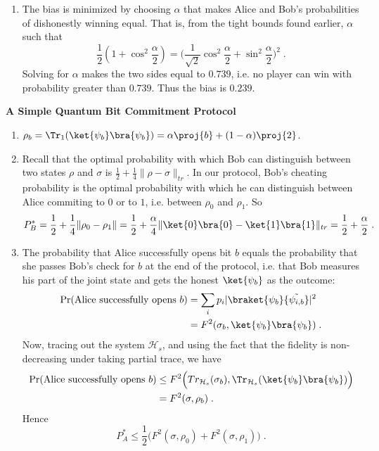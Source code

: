 \begin{exercises}
\begin{enumerate}
\item The bias is minimized by choosing $\alpha$ that makes Alice and Bob's probabilities of dishonestly winning equal. That is, from the tight bounds found earlier, $\alpha$ such that
\begin{equation*}
\frac12(1+\cos^2\frac{\alpha}{2}) = \Big(\frac{1}{\sqrt{2}}\cos^2\frac{\alpha}{2} + \sin^2\frac{\alpha}{2}\Big)^2\;.
\end{equation*}
Solving for $\alpha$ makes the two sides equal to $0.739$, i.e. no player can win with probability greater than $0.739$. Thus the bias is $0.239$.
\end{enumerate}

\item {\bf A Simple Quantum Bit Commitment Protocol}
\begin{enumerate}
\item $\rho_b = \Tr_1(\ket{\psi_b}\bra{\psi_b}) = \alpha \proj{b} + (1-\alpha) \proj{2}$.

\item Recall that the optimal probability with which Bob can distinguish between two states $\rho$ and $\sigma$ is $\frac12 + \frac14 \|\rho-\sigma\|_{tr}$.
In our protocol, Bob's cheating probability is the optimal probability with which he can distinguish between Alice commiting to $0$ or to $1$, i.e. between $\rho_0$ and $\rho_1$. 
So 
\[ P_B^{*} = \frac12 + \frac14 \|\rho_0 - \rho_1\| = \frac12 + \frac{\alpha}{4} \| \ket{0}\bra{0}- \ket{1}\bra{1}\|_{tr} = \frac12 + \frac{\alpha}{2}\;.\]

\item The probability that Alice successfully opens bit $b$ equals the probability that she passes Bob's check for $b$ at the end of the protocol, i.e. that Bob measures his part of the joint state and gets the honest $\ket{\psi_b}$ as the outcome:
\begin{align*}
\Pr(\mbox{Alice successfully opens $b$}) &= \sum_{i} p_i |\braket{\psi_b}{\tilde{\psi_{i,b}}}|^2 \\
&= F^2(\sigma_b, \ket{\psi_b}\bra{\psi_b})\;.
\end{align*}
Now, tracing out the system $\mathcal{H}_s$, and using the fact that the fidelity is non-decreasing under taking partial trace, we have
\begin{align*}
\Pr(\mbox{Alice successfully opens $b$}) &\leq F^2\Big(Tr_{\mathcal{H}_s}(\sigma_b), \Tr_{\mathcal{H}_s}(\ket{\psi_b}\bra{\psi_b})\Big)\\
& = F^2(\sigma, \rho_b)\;.
\end{align*}
Hence
\begin{equation*}
P_A^* \leq \frac{1}{2} \big( F^2(\sigma, \rho_0) + F^2(\sigma, \rho_1) \big)\;.
\end{equation*}


\end{enumerate}
\end{exercises}
